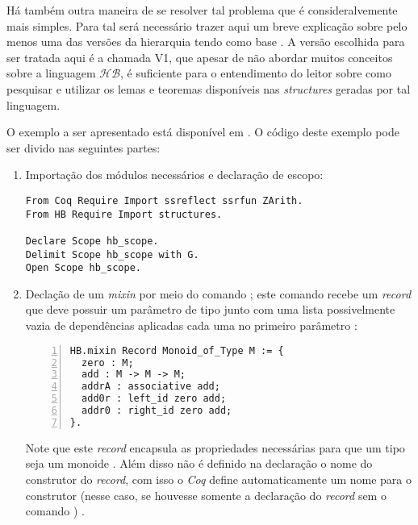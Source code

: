 {{Há também outra maneira de se resolver tal problema que é consideralvemente mais simples. Para tal será necessário trazer aqui um breve explicação sobre pelo menos uma das versões da hierarquia tendo como base \cite{cohen:hal-02478907}. A versão escolhida para ser tratada aqui é a chamada V1, que apesar de não abordar muitos conceitos sobre a linguagem $\mathcal{HB}$, é suficiente para o entendimento do leitor sobre como pesquisar e utilizar os lemas e teoremas disponíveis nas \textit{structures} geradas por tal linguagem.

O exemplo a ser apresentado está disponível em \cite{mathcomp-hb-v1}. O código deste exemplo pode ser divido nas seguintes partes:
    \begin{enumerate}
        \item Importação dos módulos necessários e declaração de escopo:
        \begin{lstlisting}[language=coq, frame=single, tabsize=1]
From Coq Require Import ssreflect ssrfun ZArith.
From HB Require Import structures.

Declare Scope hb_scope.
Delimit Scope hb_scope with G.
Open Scope hb_scope.
        \end{lstlisting}
    
        \item \label{item:mixin-monoid} Declação de um \textit{mixin} por meio do comando ; este comando recebe um \textit{record} que deve possuir um parâmetro de tipo  junto com uma lista possivelmente vazia de dependências 
        aplicadas cada uma no primeiro parâmetro \cite{cohen:hal-02478907}:
            \begin{lstlisting}[language=coq, frame=single, tabsize=1, numbers=left]
HB.mixin Record Monoid_of_Type M := {
  zero : M;
  add : M -> M -> M;
  addrA : associative add;
  add0r : left_id zero add;
  addr0 : right_id zero add;
}.
            \end{lstlisting}
        Note que este \textit{record} encapsula as propriedades necessárias para que um tipo  seja um monoide \cite{cohen:hal-02478907}. Além disso não é definido na declaração o nome do construtor do \textit{record}, com isso o \textit{Coq} define automaticamente um nome para o construtor (nesse caso, se houvesse somente a declaração do \textit{record} sem o comando  ) \cite{cohen:hal-02478907}.


\end{enumerate}}}
